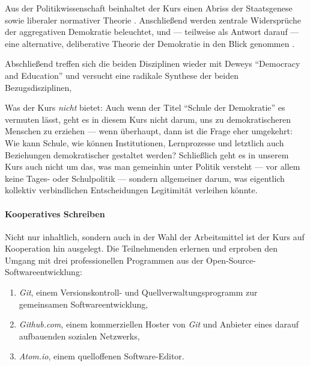 Aus der Politikwissenschaft beinhaltet der Kurs einen Abriss der Staatsgenese \parencite{Tilly-1985-aa} sowie liberaler normativer Theorie \parencites{Dahl-1989-aa}.
Anschließend werden zentrale Widersprüche \parencite{Condorcet1785,Arrow1950} der aggregativen Demokratie beleuchtet, und --- teilweise als Antwort darauf --- eine alternative, deliberative Theorie der Demokratie in den Blick genommen \parencite{Cohen-1989-aa,Habermas1988a}.

Abschließend treffen sich die beiden Disziplinen wieder mit Deweys ``Democracy and Education'' \parencite{Dewey-1916} und versucht eine radikale Synthese der beiden Bezugsdisziplinen,

Was der Kurs \emph{nicht} bietet:
Auch wenn der Titel ``Schule der Demokratie'' es vermuten lässt, geht es in diesem Kurs nicht darum, uns zu demokratischeren Menschen zu erziehen --- wenn überhaupt, dann ist die Frage eher umgekehrt:
Wie kann Schule, wie können Institutionen, Lernprozesse und letztlich auch Beziehungen demokratischer gestaltet werden?
Schließlich geht es in unserem Kurs auch nicht um das, was man gemeinhin unter Politik versteht --- vor allem keine Tages- oder Schulpolitik --- sondern allgemeiner darum, was eigentlich kollektiv verbindlichen Entscheidungen Legitimität verleihen könnte.


\paragraph{Kooperatives Schreiben}
Nicht nur inhaltlich, sondern auch in der Wahl der Arbeitsmittel ist der Kurs auf Kooperation hin ausgelegt.
Die Teilnehmenden erlernen und erproben den Umgang mit drei professionellen Programmen aus der Open-Source-Softwareentwicklung:

\begin{enumerate}
	\item \emph{Git}, einem Versionskontroll- und Quellverwaltungsprogramm zur gemeinsamen Softwareentwicklung,
	\item \emph{Github.com}, einem kommerziellen Hoster von \emph{Git} und Anbieter eines darauf aufbauenden sozialen Netzwerks,
	\item \emph{Atom.io}, einem quelloffenen Software-Editor.
\end{enumerate}